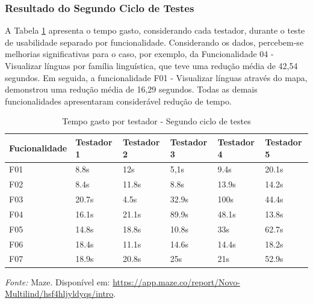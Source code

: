 \subsubsection{Resultado do Segundo Ciclo de Testes}
\label{sec:Resultado do Segundo Ciclo de Testes}
A Tabela \ref{tab07} apresenta o tempo gasto, considerando cada testador, durante o teste de usabilidade separado por funcionalidade. Considerando os dados, percebem-se melhorias significativas para o caso, por exemplo, da Funcionalidade 04 - Visualizar línguas 
por família linguística, que teve uma redução média de 42,54 segundos. Em seguida, a funcionalidade F01 - Visualizar línguas através do mapa, demonstrou uma redução média de 16,29 segundos. Todas as demais funcionalidades apresentaram considerável redução de 
tempo. 

\begin{table}[h!]
	\centering
	\caption{Tempo gasto por testador - Segundo ciclo de testes}
	\label{tab07}
	\begin{adjustbox}{center}
	\begin{tabular}{l|l|l|l|l|l}
	\hline
	Fucionalidade & Testador 1 & Testador 2 & Testador 3 & Testador 4 & Testador 5 \\ 	\hline
	F01                   & 8.8s     & 12s     & 5,1s      & 9.4s       & 20.1s      \\
	F02                   & 8.4s        & 11.8s      & 8.8s      & 13.9s    & 14.2s     \\
	F03                   & 20.7s        & 4.5s      & 32.9s      & 100s     & 44.4s     \\
	F04                   & 16.1s        & 21.1s     & 89.9s     & 48.1s     & 13.8s     \\
	F05                   & 14.8s      & 18.8s      & 10.8s     & 33s     & 62.7s     \\
	F06                   & 18.4s     & 11.1s      & 14.6s     & 14.4s     & 18.2s     \\
	F07                   & 18.9s     & 20.8s      & 25s     & 21s    & 52.9s       \\ 	\hline
	\end{tabular}
	\end{adjustbox}
	\begin{tablenotes}[flushleft]
		\centering
		\item \textit{Fonte:} Maze. Disponível em: \url{https://app.maze.co/report/Novo-Multilind/hsf4hljyldyqs/intro}.
	  \end{tablenotes}
\end{table}

